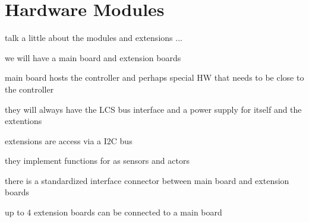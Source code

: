 \chapter{Hardware Modules}

talk a little about the modules and extensions ...

we will have a main board and extension boards

main board hosts the controller and perhaps special HW that needs to be close to the controller

they will always have the LCS bus interface and a power supply for itself and the extentions

extensions are access via a I2C bus

they implement functions for as sensors and actors

there is a standardized interface connector between main board and extension boards

up to 4 extension boards can be connected to a main board



